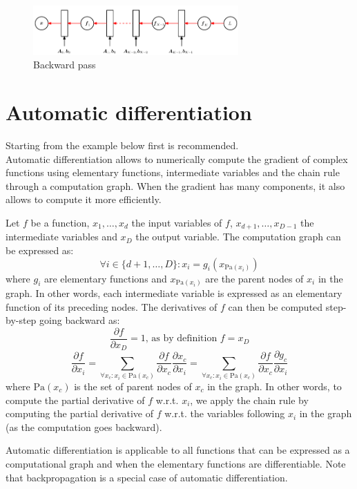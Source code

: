 \begin{figure}[H]
    \centering
    \includegraphics[width=0.7\textwidth]{img/_backward_pass.pdf}
    \caption{Backward pass}
\end{figure}



\section{Automatic differentiation}
Starting from the example below first is recommended.\\

Automatic differentiation allows to numerically compute 
the gradient of complex functions using elementary functions, intermediate variables and the chain rule through a computation graph.
When the gradient has many components, it also allows to compute it more efficiently.

Let $f$ be a function,
$x_1, \dots, x_d$ the input variables of $f$,
$x_{d+1}, \dots, x_{D-1}$ the intermediate variables and
$x_D$ the output variable.
The computation graph can be expressed as:
\[
    \forall i \in \{ d+1, \dots, D \}: x_i = g_i(x_{\text{Pa}(x_i)})
\]
where $g_i$ are elementary functions and $x_{\text{Pa}(x_i)}$ are the parent nodes of $x_i$ in the graph.
In other words, each intermediate variable is expressed as an elementary function of its preceding nodes.
The derivatives of $f$ can then be computed step-by-step going backward as:
\[ \frac{\partial f}{\partial x_D} = 1 \text{, as by definition } f = x_D \]
\[ 
    \frac{\partial f}{\partial x_i} = \sum_{\forall x_c: x_i \in \text{Pa}(x_c)} \frac{\partial f}{\partial x_c} \frac{\partial x_c}{\partial x_i}
        = \sum_{\forall x_c: x_i \in \text{Pa}(x_c)} \frac{\partial f}{\partial x_c} \frac{\partial g_c}{\partial x_i}
\]
where $\text{Pa}(x_c)$ is the set of parent nodes of $x_c$ in the graph.
In other words, to compute the partial derivative of $f$ w.r.t. $x_i$, 
we apply the chain rule by computing 
the partial derivative of $f$ w.r.t. the variables following $x_i$ in the graph (as the computation goes backward).

Automatic differentiation is applicable to all functions that can be expressed as a computational graph and 
when the elementary functions are differentiable.
Note that backpropagation is a special case of automatic differentiation.


